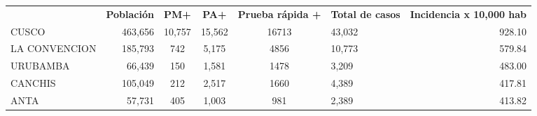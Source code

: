\begin{tabular}{lrccclr}
	\rowcolor[HTML]{DCE6F1} 
	\multicolumn{1}{c}{\cellcolor[HTML]{DCE6F1}\textbf{PROVINCIA}} & \multicolumn{1}{c}{\cellcolor[HTML]{DCE6F1}\textbf{Población}} & \textbf{PM+}                                                & \textbf{PA+}         & \textbf{Prueba rápida +} & \multicolumn{1}{c}{\cellcolor[HTML]{DCE6F1}\textbf{Total de casos}} & \multicolumn{1}{c}{\cellcolor[HTML]{DCE6F1}\textbf{Incidencia x 10,000 hab}} \\
	\cellcolor[HTML]{FF5050}CUSCO                                  & 463,656                                                        & 10,757                                                      & 15,562               & 16713                    & 43,032                                                              & 928.10                                                                       \\
	\cellcolor[HTML]{F4B084}LA   CONVENCION                        & 185,793                                                        & 742                                                         & 5,175                & 4856                     & 10,773                                                              & 579.84                                                                       \\
	\cellcolor[HTML]{F4B084}URUBAMBA                               & 66,439                                                         & 150                                                         & 1,581                & 1478                     & 3,209                                                               & 483.00                                                                       \\
	\cellcolor[HTML]{FFE699}CANCHIS                                & 105,049                                                        & 212                                                         & 2,517                & 1660                     & 4,389                                                               & 417.81                                                                       \\
	\cellcolor[HTML]{FFE699}ANTA                                   & 57,731                                                         & 405                                                         & 1,003                & 981                      & 2,389                                                               & 413.82                                                                       \\

\end{tabular}

